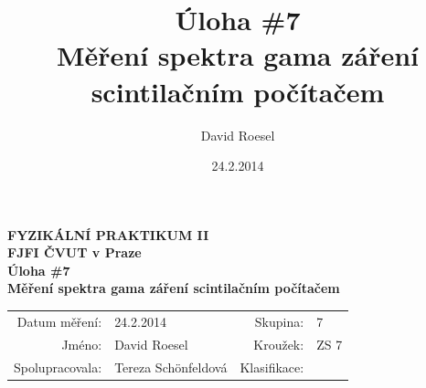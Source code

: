\documentclass[english]{article}
\newcommand{\Author}{David Roesel}
\newcommand{\Coauthor}{Tereza Schönfeldová}
\newcommand{\Institute}{FJFI ČVUT v Praze}
\newcommand{\Subject}{FYZIKÁLNÍ PRAKTIKUM II}
\newcommand{\Group}{7}
\newcommand{\Circle}{ZS 7}
\newcommand{\Title}{Úloha \#7  \\Měření spektra gama záření scintilačním počítačem}
\newcommand{\Date}{24.2.2014}
\begin{document}
\author{\Author}
\title{\Title}
\date{\Date}

\renewcommand{\figurename}{Obr.}
\renewcommand{\tablename}{Tab.}
\renewcommand{\refname}{Reference}


\setlength{\parindent}{0cm}
\begin{multicols}{2}
\textbf{\Subject \\
        \Institute \\[0.1cm]
\Title \\[0.5cm]
}
\begin{tabular}{rlrl}
\large Datum měření: & \Date & \large Skupina: & \Group \\
\large Jméno: & \Author & \large Kroužek:  & \Circle\\
\large Spolupracovala: & \Coauthor &\large Klasifikace:\\
\end{tabular}


\end{multicols}
\end{document}
